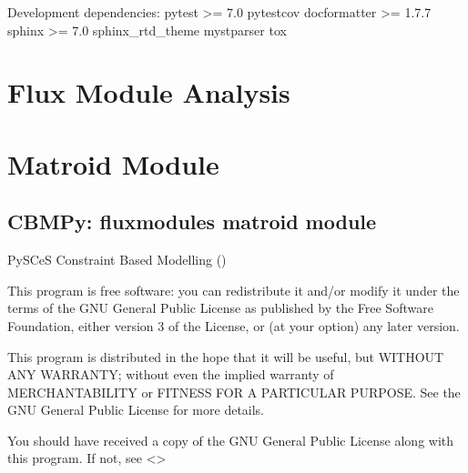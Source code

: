 \documentclass[letterpaper,12pt,english]{sphinxmanual}
\begin{document}
\sphinxAtStartPar
Development dependencies:
\sphinxhyphen{} pytest \textgreater{}= 7.0
\sphinxhyphen{} pytest\sphinxhyphen{}cov
\sphinxhyphen{} docformatter \textgreater{}= 1.7.7
\sphinxhyphen{} sphinx \textgreater{}= 7.0
\sphinxhyphen{} sphinx\_rtd\_theme
\sphinxhyphen{} myst\sphinxhyphen{}parser
\sphinxhyphen{} tox

\sphinxstepscope


\section{Flux Module Analysis}
\label{\detokenize{api/modules:flux-module-analysis}}\label{\detokenize{api/modules::doc}}

\section{Matroid Module}
\label{\detokenize{api/modules:matroid-module}}\label{\detokenize{api/modules:module-cbmpy.fluxmodules}}

\subsection{CBMPy: fluxmodules matroid module}
\label{\detokenize{api/modules:cbmpy-fluxmodules-matroid-module}}\label{\detokenize{api/modules:module-cbmpy.fluxmodules.matroid}}
\sphinxAtStartPar
PySCeS Constraint Based Modelling ()

\sphinxAtStartPar
This program is free software: you can redistribute it and/or modify
it under the terms of the GNU General Public License as published by
the Free Software Foundation, either version 3 of the License, or
(at your option) any later version.

\sphinxAtStartPar
This program is distributed in the hope that it will be useful,
but WITHOUT ANY WARRANTY; without even the implied warranty of
MERCHANTABILITY or FITNESS FOR A PARTICULAR PURPOSE.  See the
GNU General Public License for more details.

\sphinxAtStartPar
You should have received a copy of the GNU General Public License
along with this program.  If not, see \textless{}\textgreater{}
\end{document}
